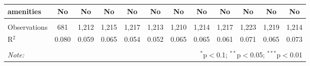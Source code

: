 \begin{table}[!htbp]
\begin{tabular}{@{\extracolsep{5pt}}lccccccccccc}
amenities & No & No & No & No & No & No & No & No & No & No & No \\ 
\hline \\[-1.8ex] 
Observations & 681 & 1,212 & 1,215 & 1,217 & 1,213 & 1,210 & 1,214 & 1,217 & 1,223 & 1,219 & 1,214 \\ 
R$^{2}$ & 0.080 & 0.059 & 0.065 & 0.054 & 0.052 & 0.065 & 0.065 & 0.061 & 0.071 & 0.065 & 0.073 \\ 
\hline 
\hline \\[-1.8ex] 
\textit{Note:}  & \multicolumn{11}{r}{$^{*}$p$<$0.1; $^{**}$p$<$0.05; $^{***}$p$<$0.01} \\ 
\end{tabular} 
\end{table} 
